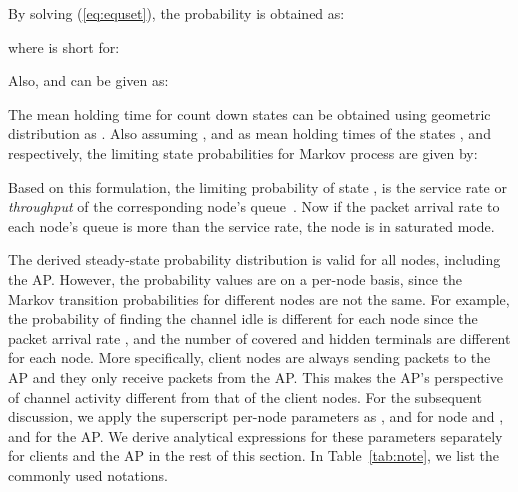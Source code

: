\documentclass[10pt,journal,cspaper,compsoc]{IEEEtran}
\begin{document}
By solving (\ref{eq:equset}), the probability  is obtained as:
\small

\normalsize
where  is short for:

\normalsize

Also,  and  can be given as:
\small

\normalsize


The mean holding time for count down states  can be obtained using geometric distribution as . Also assuming ,  and  as mean holding times of the states ,  and  respectively, the limiting state probabilities for Markov process  are given by:



Based on this formulation, the limiting probability of state ,  is the service rate or \textit{throughput} of the corresponding node's queue~\cite{Dai13}.  Now if the packet arrival rate  to each node's queue is more than the service rate, the node is in saturated mode. 




The derived steady-state probability distribution is valid for all nodes, including the AP. However, the probability values are on a per-node basis, since the Markov transition probabilities for different nodes are not the same. For example, the probability of finding the channel idle  is different for each node since the packet arrival rate , and the number of covered and hidden terminals are different for each node. More specifically, client nodes are always sending packets to the AP and they only receive packets from the AP. This makes the AP's perspective of channel activity different from that of the client nodes. For the subsequent discussion, we apply the superscript per-node parameters as ,  and  for node  and ,  and  for the AP. We derive analytical expressions for these parameters separately for clients and the AP in the rest of this section. In Table~\ref{tab:note}, we list the commonly used notations.
\end{document}
